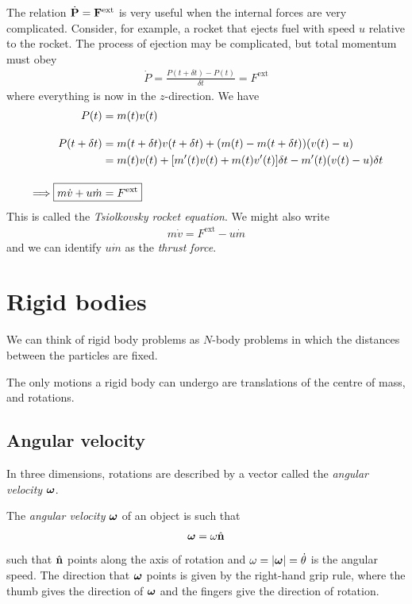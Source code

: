 \documentclass{../template/note}
\begin{document}
    The relation \(\dot{\V P} = \V F^\text{ext}\) is very useful when the internal forces are very complicated. Consider, for example, a rocket that ejects fuel with speed \(u\) relative to the rocket. The process of ejection may be complicated, but total momentum must obey
    \begin{align*}
        \dot P = \frac{P(t + \delta t) - P(t)}{\delta t} = F^\text{ext}
    \end{align*}
    where everything is now in the \(z\)-direction. We have
    \begin{align*}
        P(t) &= m(t)v(t) \\[10pt]
        P(t + \delta t) &= m(t + \delta t)v(t + \delta t) + (m(t) - m(t + \delta t))(v(t) - u) \\
        &= m(t)v(t) + [m'(t)v(t) + m(t)v'(t)] \delta t - m'(t)(v(t)-u) \delta t \\[10pt]
        \implies \Aboxed{m \dot v + u \dot m &= F^\text{ext}}
    \end{align*}
    This is called the \emph{Tsiolkovsky rocket equation}. We might also write
    \begin{align*}
        m \dot v = F^\text{ext} - u \dot m
    \end{align*}
    and we can identify \(u \dot m\) as the \emph{thrust force}.
    
    \section{Rigid bodies}
    
    We can think of rigid body problems as \(N\)-body problems in which the distances between the particles are fixed.

    The only motions a rigid body can undergo are translations of the centre of mass, and rotations.

    \subsection{Angular velocity}

    In three dimensions, rotations are described by a vector called the \emph{angular velocity} \(\V \omega\).

    \begin{definition}
        The \emph{angular velocity} \(\V \omega\) of an object is such that
        \begin{align*}
            \V \omega = \omega \hvec n
        \end{align*}
        such that \(\hvec n\) points along the axis of rotation and \(\omega = |\V \omega| = \dot \theta\) is the angular speed. The direction that \(\V \omega\) points is given by the right-hand grip rule, where the thumb gives the direction of \(\V \omega\) and the fingers give the direction of rotation. 
    \end{definition}
    
\end{document}
